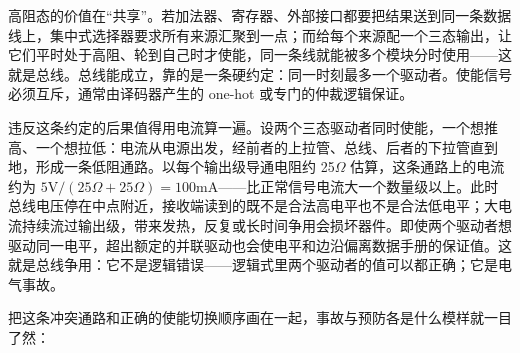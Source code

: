 高阻态的价值在“共享”。若加法器、寄存器、外部接口都要把结果送到同一条数据线上，集中式选择器要求所有来源汇聚到一点；而给每个来源配一个三态输出，让它们平时处于高阻、轮到自己时才使能，同一条线就能被多个模块分时使用——这就是总线。总线能成立，靠的是一条硬约定：同一时刻最多一个驱动者。使能信号必须互斥，通常由译码器产生的 one-hot 或专门的仲裁逻辑保证。

违反这条约定的后果值得用电流算一遍。设两个三态驱动者同时使能，一个想推高、一个想拉低：电流从电源出发，经前者的上拉管、总线、后者的下拉管直到地，形成一条低阻通路。以每个输出级导通电阻约 25$\Omega$ 估算，这条通路上的电流约为 $5\mathrm{V} / (25\Omega + 25\Omega) = 100\mathrm{mA}$——比正常信号电流大一个数量级以上。此时总线电压停在中点附近，接收端读到的既不是合法高电平也不是合法低电平；大电流持续流过输出级，带来发热，反复或长时间争用会损坏器件。即使两个驱动者想驱动同一电平，超出额定的并联驱动也会使电平和边沿偏离数据手册的保证值。这就是总线争用：它不是逻辑错误——逻辑式里两个驱动者的值可以都正确；它是电气事故。

把这条冲突通路和正确的使能切换顺序画在一起，事故与预防各是什么模样就一目了然：

